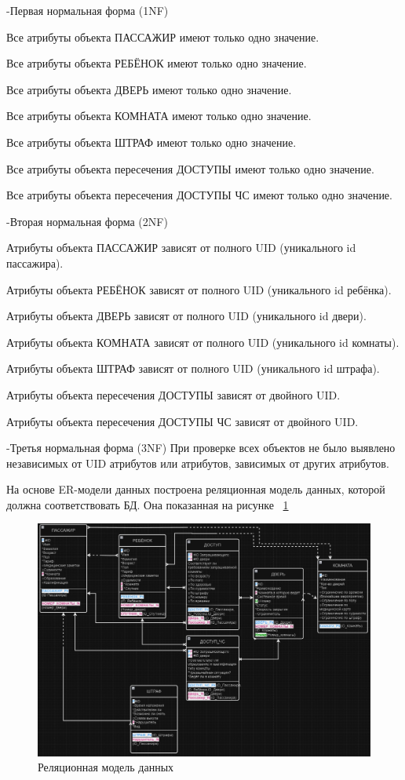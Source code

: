 -Первая нормальная форма (1NF)

Все атрибуты объекта ПАССАЖИР имеют только одно значение.

Все атрибуты объекта РЕБЁНОК имеют только одно значение.

Все атрибуты объекта ДВЕРЬ имеют только одно значение.

Все атрибуты объекта КОМНАТА имеют только одно значение.

Все атрибуты объекта ШТРАФ имеют только одно значение.

Все атрибуты объекта пересечения ДОСТУПЫ имеют только одно значение.

Все атрибуты объекта пересечения ДОСТУПЫ ЧС имеют только одно значение.



-Вторая нормальная форма (2NF)

Атрибуты объекта ПАССАЖИР зависят от полного UID (уникального id пассажира).

Атрибуты объекта РЕБЁНОК зависят от полного UID (уникального id ребёнка).

Атрибуты объекта ДВЕРЬ зависят от полного UID (уникального id двери).

Атрибуты объекта КОМНАТА зависят от полного UID (уникального id комнаты).

Атрибуты объекта ШТРАФ зависят от полного UID (уникального id штрафа).

Атрибуты объекта пересечения ДОСТУПЫ зависят от двойного UID.

Атрибуты объекта пересечения ДОСТУПЫ ЧС зависят от двойного UID.



-Третья нормальная форма (3NF)
При проверке всех объектов не было выявлено независимых от UID атрибутов или атрибутов, зависимых от других атрибутов.

На основе ER-модели данных построена реляционная модель данных, которой должна соответствовать БД. Она показанная на рисунке  ~\ref{fig:commonscheme3}

\begin{figure}[H]
	\centering
	\includegraphics[width=1.0\linewidth]{images/CommonScheme3}
	\caption{Реляционная модель данных}
	\label{fig:commonscheme3}
\end{figure}

